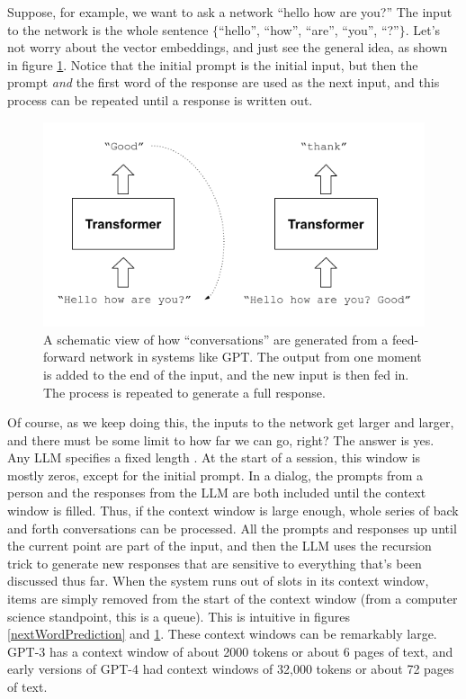 Suppose, for example, we want to ask a network ``hello how are you?'' The input to the network is the whole sentence $\{$``hello'', ``how'', ``are'', ``you'', ``?''$\}$. Let's  not worry about the vector embeddings, and just see the general idea, as shown in figure \ref{gptRecursedInputs}. Notice that the initial prompt is the initial input, but then the prompt \emph{and} the first word of the response are used as the next input, and this process can be repeated until a response is written out.
  
\begin{figure}[h]
\centering
\includegraphics[scale=.7]{./images/gptRecursedInputs.png}
\caption[Jeff Yoshimi]{A schematic view of how ``conversations'' are generated from a feed-forward network in systems like GPT. The output from one moment is added to the end of the input, and the new input is then fed in. The process is repeated to generate a full response.}
\label{gptRecursedInputs}
\end{figure}

Of course, as we keep doing this, the inputs to the network get larger and larger, and there must be some limit to how far we can go, right?  The answer is yes. Any LLM specifies a fixed length . At the start of a session, this window is mostly zeros, except for the initial prompt.  In a dialog, the prompts from a person and the responses from the LLM are both included until the context window is filled. Thus, if the context window is large enough, whole series of back and forth conversations can be processed.  All the prompts and responses up until the current point are part of the input, and then the LLM uses the recursion trick to generate new responses that are sensitive to everything that's been discussed thus far. When the system runs out of slots in its context window, items are simply removed from the start of the context window (from a computer science standpoint, this is a queue). This is intuitive in figures \ref{nextWordPrediction} and \ref{gptRecursedInputs}. These context windows can be remarkably large. GPT-3 has a context window of about 2000 tokens or about 6 pages of text, and early versions of GPT-4 had context windows of 32,000 tokens or about 72 pages of text.  


